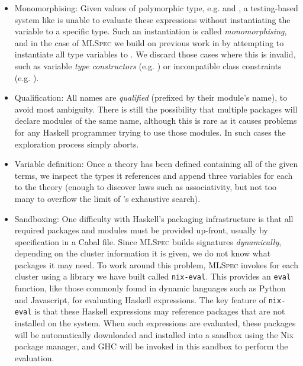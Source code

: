 \begin{itemize}
\item{Monomorphising}: Given values of polymorphic type, e.g.  and , a testing-based
  system like \qspec{} is unable to evaluate these expressions without
  instantiating the variable  to a specific type. Such an instantiation is
  called \emph{monomorphising}, and in the case of \textsc{MLSpec} we build on
  previous work in \qcheck{} by attempting to instantiate all type variables to
  . We discard those cases where this is invalid, such as variable
  \emph{type constructors} (e.g. ) or
  incompatible class constraints (e.g. ).

\item{Qualification}: All names are \emph{qualified} (prefixed by their module's
  name), to avoid most ambiguity. There is still the possibility that multiple
  packages will declare modules of the same name, although this is rare as it
  causes problems for any Haskell programmer trying to use those modules. In
  such cases the exploration process simply aborts.

\item{Variable definition}: Once a \qspec{} theory has been defined containing
  all of the given terms, we inspect the types it references and append three
  variables for each to the theory (enough to discover laws such as
  associativity, but not too many to overflow the limit of \qspec{}'s exhaustive
  search).

\item{Sandboxing}: One difficulty with Haskell's packaging infrastructure is
  that all required packages and modules must be provided up-front, usually by
  specification in a Cabal file. Since \textsc{MLSpec} builds signatures
  \emph{dynamically}, depending on the cluster information it is given, we do
  not know what packages it may need. To work around this problem,
  \textsc{MLSpec} invokes \qspec{} for each cluster using a library we have
  built called \texttt{nix-eval}. This provides an \texttt{eval} function, like
  those commonly found in dynamic languages such as Python and Javascript, for
  evaluating Haskell expressions. The key feature of \texttt{nix-eval} is that
  these Haskell expressions may reference packages that are not installed on the
  system. When such expressions are evaluated, these packages will be
  automatically downloaded and installed into a sandbox using the Nix package
  manager, and GHC will be invoked in this sandbox to perform the evaluation.
\end{itemize}
